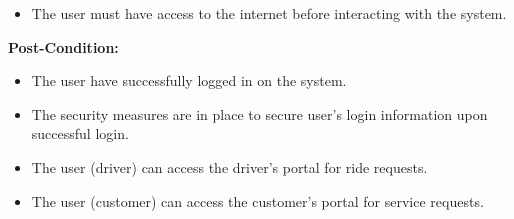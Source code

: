 \documentclass[9pt]{report}
\begin{document}
\begin{itemize}
    \item The user must have access to the internet before interacting with the system.
\end{itemize}
\textbf{Post-Condition:}
\begin{itemize}
    \item The user have successfully logged in on the system.
    \item The security measures are in place to secure user's login information upon successful login.
    \item The user (driver) can access the driver’s portal for ride requests.
    \item The user (customer) can access the customer’s portal for service requests.
\end{itemize}

\end{document}
